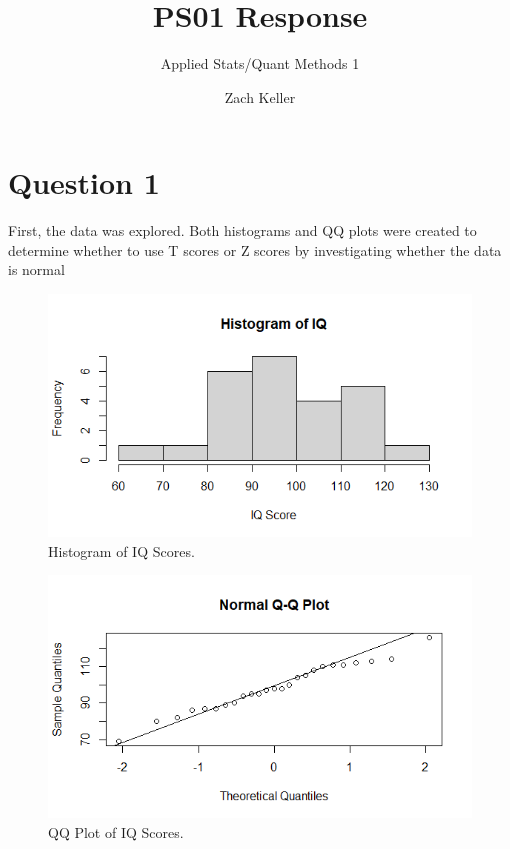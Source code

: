 \documentclass[12pt,letterpaper]{article}
\title{PS01 Response}
\date{Zach Keller}
\author{Applied Stats/Quant Methods 1}
\begin{document}
	\maketitle
	


\section*{Question 1 }

\vspace{.25cm}

\noindent First, the data was explored. Both histograms and QQ plots were created to determine whether to use T scores or Z scores by investigating whether the data is normal \\ 

\begin{figure}[h!]\centering
	\caption{\footnotesize Histogram of IQ Scores.}
	\label{fig:plot_1}
	\includegraphics[width=.75\textwidth]{iqhist.png}
\end{figure} 

\begin{figure}[h!]\centering
	\caption{\footnotesize QQ Plot of IQ Scores.}
	\label{fig:plot_1}
	\includegraphics[width=.75\textwidth]{qqplotiq.png}
\end{figure}
\end{document}
